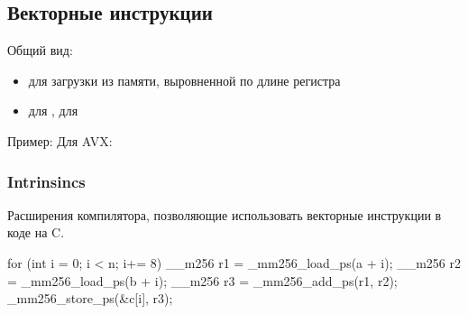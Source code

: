   \subsection{Векторные инструкции}
    Общий вид: 
    \begin{itemize}
      \item {} для загрузки из памяти, выровненной по длине регистра
      \item {} для ,  для 
    \end{itemize}
    Пример: 
    Для AVX: 
  
  \subsubsection{Intrinsincs}
    Расширения компилятора, позволяющие использовать векторные инструкции в коде на C.
    \begin{cminted}
for (int i = 0; i < n; i+= 8) {
  __m256 r1 = _mm256_load_ps(a + i);
  __m256 r2 = _mm256_load_ps(b + i);
  __m256 r3 = _mm256_add_ps(r1, r2);
  _mm256_store_ps(&c[i], r3);
}  
    \end{cminted}
